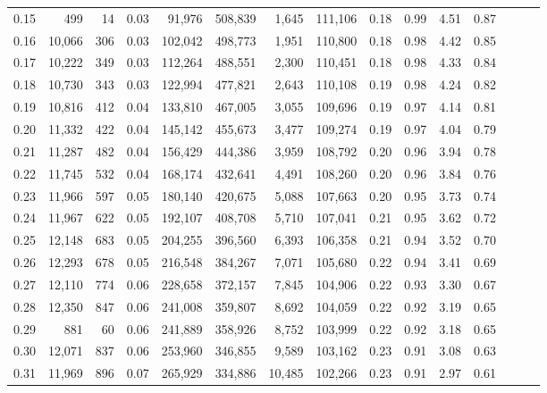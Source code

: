 \begin{tabular}{rrrrrrrrrrrrrrr}
0.15 &     499 &     14 &  0.03 &   91,976 &  508,839 &    1,645 &  111,106 &  0.18 &  0.99 &  4.51 &      0.87 \\
0.16 &  10,066 &    306 &  0.03 &  102,042 &  498,773 &    1,951 &  110,800 &  0.18 &  0.98 &  4.42 &      0.85 \\
0.17 &  10,222 &    349 &  0.03 &  112,264 &  488,551 &    2,300 &  110,451 &  0.18 &  0.98 &  4.33 &      0.84 \\
0.18 &  10,730 &    343 &  0.03 &  122,994 &  477,821 &    2,643 &  110,108 &  0.19 &  0.98 &  4.24 &      0.82 \\
0.19 &  10,816 &    412 &  0.04 &  133,810 &  467,005 &    3,055 &  109,696 &  0.19 &  0.97 &  4.14 &      0.81 \\
0.20 &  11,332 &    422 &  0.04 &  145,142 &  455,673 &    3,477 &  109,274 &  0.19 &  0.97 &  4.04 &      0.79 \\
0.21 &  11,287 &    482 &  0.04 &  156,429 &  444,386 &    3,959 &  108,792 &  0.20 &  0.96 &  3.94 &      0.78 \\
0.22 &  11,745 &    532 &  0.04 &  168,174 &  432,641 &    4,491 &  108,260 &  0.20 &  0.96 &  3.84 &      0.76 \\
0.23 &  11,966 &    597 &  0.05 &  180,140 &  420,675 &    5,088 &  107,663 &  0.20 &  0.95 &  3.73 &      0.74 \\
0.24 &  11,967 &    622 &  0.05 &  192,107 &  408,708 &    5,710 &  107,041 &  0.21 &  0.95 &  3.62 &      0.72 \\
0.25 &  12,148 &    683 &  0.05 &  204,255 &  396,560 &    6,393 &  106,358 &  0.21 &  0.94 &  3.52 &      0.70 \\
0.26 &  12,293 &    678 &  0.05 &  216,548 &  384,267 &    7,071 &  105,680 &  0.22 &  0.94 &  3.41 &      0.69 \\
0.27 &  12,110 &    774 &  0.06 &  228,658 &  372,157 &    7,845 &  104,906 &  0.22 &  0.93 &  3.30 &      0.67 \\
0.28 &  12,350 &    847 &  0.06 &  241,008 &  359,807 &    8,692 &  104,059 &  0.22 &  0.92 &  3.19 &      0.65 \\
0.29 &     881 &     60 &  0.06 &  241,889 &  358,926 &    8,752 &  103,999 &  0.22 &  0.92 &  3.18 &      0.65 \\
0.30 &  12,071 &    837 &  0.06 &  253,960 &  346,855 &    9,589 &  103,162 &  0.23 &  0.91 &  3.08 &      0.63 \\
0.31 &  11,969 &    896 &  0.07 &  265,929 &  334,886 &   10,485 &  102,266 &  0.23 &  0.91 &  2.97 &      0.61 \\

\end{tabular}
